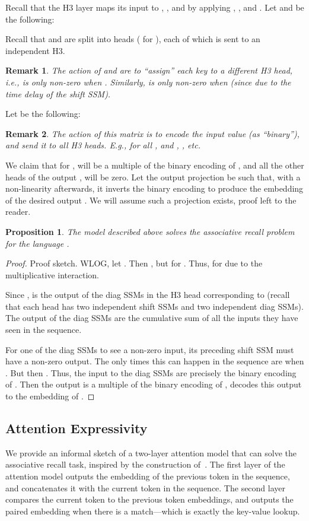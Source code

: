\documentclass{article}
\newtheorem{proposition}{Proposition}
\newtheorem*{remark}{Remark}
\newcommand{\hthree}{\textsc{H3}\xspace}
\begin{document}
Recall that the \hthree layer maps its input to , , and  by applying , , and .
Let  and  be the following:

Recall that  and  are split into  heads ( for ), each of which is sent to an independent \hthree.

\begin{remark}
The action of  and  are to ``assign'' each key to a different \hthree head, i.e.,  is only non-zero when .
Similarly,  is only non-zero when  (since  due to the time delay of the shift SSM).
\end{remark}

Let  be the following:

\begin{remark}
The action of this matrix is to encode the input value (as ``binary''), and send it to all \hthree heads.
E.g.,  for all , and , , etc.
\end{remark}

We claim that for ,  will be a multiple of the binary encoding of , and all the other heads of the output , will be zero.
Let the output projection  be such that, with a non-linearity afterwards, it inverts the binary encoding to produce the embedding of the desired output .
We will assume such a projection exists, proof left to the reader.

\begin{proposition}\label{thm:h3_expressivity}
    The model described above solves the associative recall problem for the language .
\end{proposition}

\begin{proof}
Proof sketch.
WLOG, let .
Then , but  for .
Thus,  for  due to the multiplicative interaction.

Since ,  is the output of the diag SSMs in the \hthree head corresponding to  (recall that each head has two independent shift SSMs and two independent diag SSMs).
The output of the diag SSMs are the cumulative sum of all the inputs they have seen in the sequence.

For one of the diag SSMs to see a non-zero input, its preceding shift SSM must have a non-zero output.
The only times  this can happen in the sequence are when .
But then .
Thus, the input to the diag SSMs are precisely the binary encoding of .
Then the output  is a multiple of the binary encoding of ,  decodes this output to the embedding of .
\end{proof}

\subsection{Attention Expressivity}
\label{sec:app_attention_expressivity}
We provide an informal sketch of a two-layer attention model that can solve the associative recall task, inspired by the construction of~\citep{olsson2022context}.
The first layer of the attention model outputs the embedding of the previous token in the sequence, and concatenates it with the current token in the sequence.
The second layer compares the current token to the previous token embeddings, and outputs the paired embedding when there is a match---which is exactly the key-value lookup.
\end{document}
